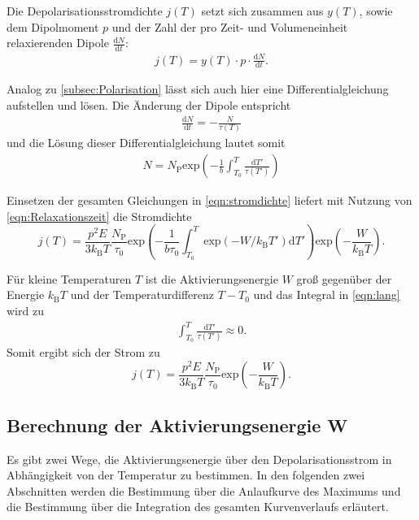 Die Depolarisationsstromdichte $j(T)$ setzt sich zusammen aus $y(T)$, sowie dem Dipolmoment $p$ und der Zahl der pro Zeit- und Volumeneinheit 
relaxierenden Dipole $\frac{\text{d}N}{\text{d}t}$:
\begin{align}
    j(T) = y(T) \cdot p \cdot \frac{\text{d}N}{\text{d}t}.
    \label{eqn:stromdichte}
\end{align}

Analog zu \autoref{subsec:Polarisation} lässt sich auch hier eine Differentialgleichung aufstellen und lösen.
Die Änderung der Dipole entspricht
\begin{align}
    \frac{\text{d} N}{\text{d} t} = -\frac{N}{\tau(T)}
\end{align}
und die Lösung dieser Differentialgleichung lautet somit 
\begin{align}
    N = N_\text{P} \text{exp}\left(-\frac{1}{b}\int_{T_0}^T\frac{\text{d}T'}{\tau(T')}\right)
\end{align}

Einsetzen der gesamten Gleichungen in \autoref{eqn:stromdichte} liefert mit Nutzung von \autoref{eqn:Relaxationszeit} die Stromdichte
\begin{equation}
  j(T) = \frac{p^2E}{3k_\text{B}T}\frac{N_\text{P}}{\tau_0}\text{exp}\left(-\frac{1}{b\tau_0}\int_{T_0}^T\text{exp}(-W/ k_ \text{B}T')\text{d}T'\right)\text{exp}\left(-\frac{W}{k_\text{B}T}\right).
 \label{eqn:lang}
\end{equation}

Für kleine Temperaturen $T$ ist die Aktivierungsenergie $W$ groß gegenüber der Energie $k_\text{B}T$ und der Temperaturdifferenz $T-T_0$ und das Integral in \autoref{eqn:lang} wird zu
\begin{align}
    \int_{T_0}^T\frac{\text{d}T'}{\tau(T')} \approx 0.
    \label{eqn:approx}
\end{align}
Somit ergibt sich der Strom zu
\begin{equation}
    j(T) = \frac{p^2E}{3k_\text{B}T}\frac{N_\text{P}}{\tau_0} \text{exp}\left(-\frac{W}{k_\text{B}T}\right).
    \label{eqn:kurz}
\end{equation}


\subsection{Berechnung der Aktivierungsenergie W}
\label{subsec:Aktivierungsenergie}

Es gibt zwei Wege, die Aktivierungsenergie über den Depolarisationsstrom in Abhängigkeit von der Temperatur zu bestimmen.
In den folgenden zwei Abschnitten werden die Bestimmung über die Anlaufkurve des Maximums und die Bestimmung über die Integration des gesamten
Kurvenverlaufs erläutert.

